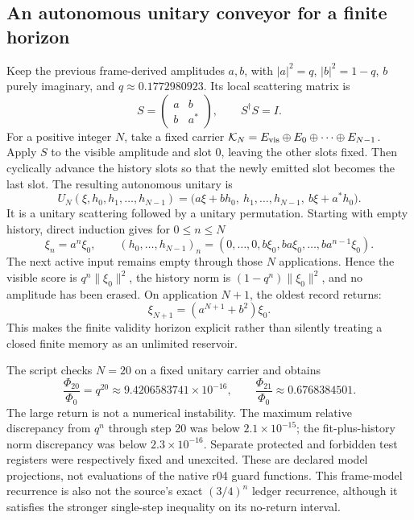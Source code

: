 \documentclass[11pt,a4paper]{article}
\begin{document}
\subsection{An autonomous unitary conveyor for a finite horizon}

Keep the previous frame-derived amplitudes $a,b$, with
$|a|^2=q$, $|b|^2=1-q$, $b$ purely imaginary, and
$q\approx0.1772980923$. Its local scattering matrix is
\[
 S=\begin{pmatrix}a&b\\b&a^*\end{pmatrix},\qquad S^\dagger S=I.
\]
For a positive integer $N$, take a fixed carrier
$\mathcal K_N=E_{\rm vis}\oplus E_0\oplus\cdots\oplus E_{N-1}$.
Apply $S$ to the visible amplitude and slot $0$, leaving the other
slots fixed. Then cyclically advance the history slots so that the
newly emitted slot becomes the last slot. The resulting autonomous
unitary is
\[
 U_N(\xi,h_0,h_1,\ldots,h_{N-1})
 =\bigl(a\xi+bh_0,\ h_1,\ldots,h_{N-1},\ b\xi+a^*h_0\bigr).
\]
It is a unitary scattering followed by a unitary permutation.
Starting with empty history, direct induction gives for $0\le n\le N$
\[
 \xi_n=a^n\xi_0,\qquad
 (h_0,\ldots,h_{N-1})_n
 =(0,\ldots,0,b\xi_0,ba\xi_0,\ldots,ba^{n-1}\xi_0).
\]
The next active input remains empty through those $N$ applications.
Hence the visible score is $q^n\|\xi_0\|^2$, the history norm is
$(1-q^n)\|\xi_0\|^2$, and no amplitude has been erased.
On application $N+1$, the oldest record returns:
\[
 \xi_{N+1}=(a^{N+1}+b^2)\xi_0.
\]
This makes the finite validity horizon explicit rather than
silently treating a closed finite memory as an unlimited reservoir.

The script checks $N=20$ on a fixed unitary carrier and obtains
\[
 \frac{\Phi_{20}}{\Phi_0}
 =q^{20}\approx9.4206583741\times10^{-16},\qquad
 \frac{\Phi_{21}}{\Phi_0}\approx0.6768384501.
\]
The large return is not a numerical instability. The maximum
relative discrepancy from $q^n$ through step 20 was below
$2.1\times10^{-15}$; the fit-plus-history norm discrepancy was
below $2.3\times10^{-16}$. Separate protected and forbidden test
registers were respectively fixed and unexcited. These are declared
model projections, not evaluations of the native r04 guard functions.
This frame-model recurrence is also not the source's exact
$(3/4)^n$ ledger recurrence, although it satisfies the stronger
single-step inequality on its no-return interval.
\end{document}
